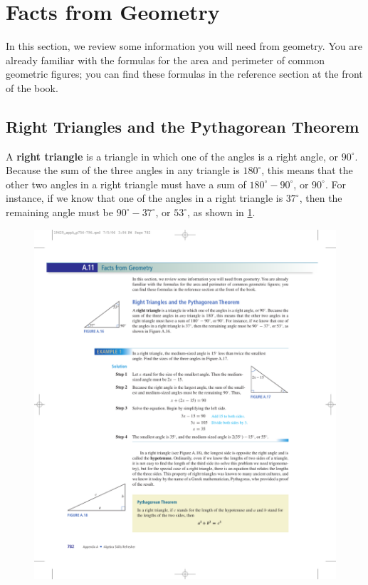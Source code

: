 \documentclass[10pt,]{book}
\newcommand{\terminology}[1]{\textbf{#1}}
\theoremstyle{plain}
\theoremstyle{definition}
\theoremstyle{definition}
\theoremstyle{definition}
\numberwithin{equation}{part}
\newcommand\degree[0]{^{\circ}}
\begin{document}
\section[{Facts from Geometry}]{Facts from Geometry}\label{appendix-Facts-from-Geometry}
In this section, we review some information you will need from geometry. You are already familiar with the formulas for the area and perimeter of common geometric figures; you can find these formulas in the reference section at the front of the book.%
\typeout{************************************************}
\typeout{************************************************}
\subsection[{Right Triangles and the Pythagorean Theorem}]{Right Triangles and the Pythagorean Theorem}\label{subsection-51}
A \terminology{right triangle} is a triangle in which one of the angles is a right angle, or \(90\degree\). Because the sum of the three angles in any triangle is \(180\degree\), this means that the other two angles in a right triangle must have a sum of \(180\degree-90\degree\), or \(90\degree\). For instance, if we know that one of the angles in a right triangle is \(37\degree\), then the remaining angle must be \(90\degree-37\degree\), or \(53\degree\), as shown in \hyperref[fig-right-triangle]{\ref{fig-right-triangle}}. \leavevmode%
\begin{figure}
\centering
\includegraphics[width=0.35\linewidth]{images/fig-right-triangle}
\caption{\label{fig-right-triangle}}
\end{figure}
%
\end{document}
